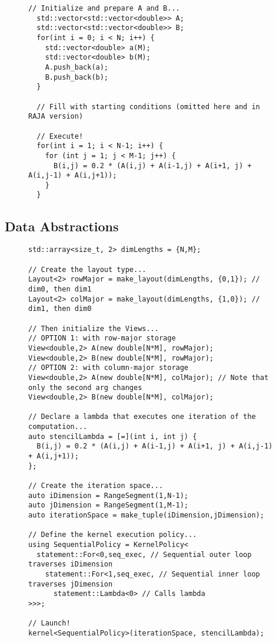 \begin{figure}
\begin{lstlisting}[caption={C++ reference implementation of a 5-point stencil computation},label=stencilCpp]
  // Initialize and prepare A and B...
  std::vector<std::vector<double>> A;
  std::vector<std::vector<double>> B;
  for(int i = 0; i < N; i++) {
    std::vector<double> a(M);
    std::vector<double> b(M);
    A.push_back(a);
    B.push_back(b);
  }

  // Fill with starting conditions (omitted here and in RAJA version)

  // Execute!
  for(int i = 1; i < N-1; i++) {
    for (int j = 1; j < M-1; j++) {
      B(i,j) = 0.2 * (A(i,j) + A(i-1,j) + A(i+1, j) + A(i,j-1) + A(i,j+1));
    }
  }
\end{lstlisting}
\end{figure}

\subsection{Data Abstractions}

\begin{figure}
\begin{lstlisting}[caption={Data declaration using RAJA multi-dimensional data abstractions, called Views, followed by the description of a 5-point stencil kernel. Changing a View's layout only requires changing the second argument in its constructor.}, label=stencilDataKernel]
std::array<size_t, 2> dimLengths = {N,M};

// Create the layout type...
Layout<2> rowMajor = make_layout(dimLengths, {0,1}); // dim0, then dim1
Layout<2> colMajor = make_layout(dimLengths, {1,0}); // dim1, then dim0

// Then initialize the Views...
// OPTION 1: with row-major storage
View<double,2> A(new double[N*M], rowMajor); 
View<double,2> B(new double[N*M], rowMajor);
// OPTION 2: with column-major storage
View<double,2> A(new double[N*M], colMajor); // Note that only the second arg changes
View<double,2> B(new double[N*M], colMajor);

// Declare a lambda that executes one iteration of the computation...
auto stencilLambda = [=](int i, int j) {
  B(i,j) = 0.2 * (A(i,j) + A(i-1,j) + A(i+1, j) + A(i,j-1) + A(i,j+1));
};

// Create the iteration space...
auto iDimension = RangeSegment(1,N-1);
auto jDimension = RangeSegment(1,M-1);
auto iterationSpace = make_tuple(iDimension,jDimension);

// Define the kernel execution policy...
using SequentialPolicy = KernelPolicy<
  statement::For<0,seq_exec, // Sequential outer loop traverses iDimension
    statement::For<1,seq_exec, // Sequential inner loop traverses jDimension
      statement::Lambda<0> // Calls lambda
>>>;

// Launch!
kernel<SequentialPolicy>(iterationSpace, stencilLambda);
\end{lstlisting}
\end{figure}

